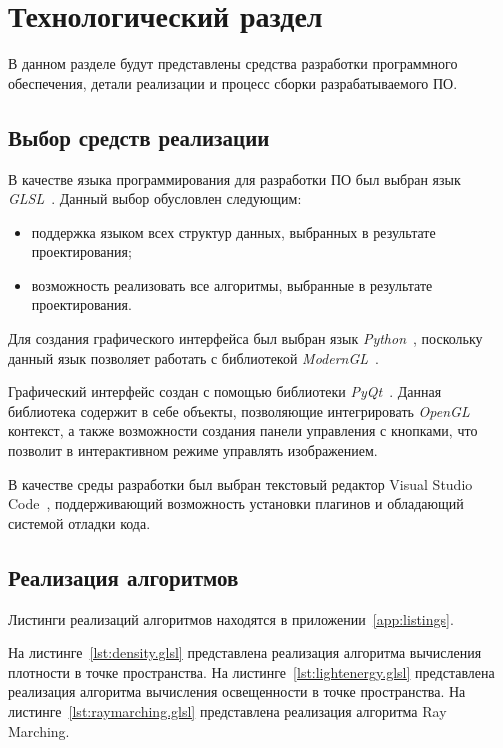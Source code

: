 \chapter{Технологический раздел}

В данном разделе будут представлены средства разработки программного обеспечения, детали реализации и процесс сборки разрабатываемого
ПО.

\section{Выбор средств реализации}

В качестве языка программирования для разработки ПО был выбран язык \textit{GLSL}~\cite{glsl}. Данный выбор обусловлен следующим:
\begin{itemize}
	\item поддержка языком всех структур данных, выбранных в результате проектирования;
	\item возможность реализовать все алгоритмы, выбранные в результате проектирования.
\end{itemize}


Для создания графического интерфейса был выбран язык \textit{Python}~\cite{python}, поскольку данный язык позволяет работать с библиотекой \textit{ModernGL}~\cite{moderngl}.
 
Графический интерфейс создан с помощью библиотеки \textit{PyQt}~\cite{pyqt}. Данная библиотека содержит в себе объекты, позволяющие интегрировать \textit{OpenGL} контекст, а также возможности создания панели управления с кнопками, что позволит в интерактивном режиме управлять изображением.

В качестве среды разработки был выбран текстовый редактор Visual Studio Code~\cite{vsc}, поддерживающий возможность установки плагинов и обладающий системой отладки кода.


\section{Реализация алгоритмов}

Листинги реализаций алгоритмов находятся в приложении~\ref{app:listings}.

На листинге~\ref{lst:density.glsl} представлена реализация алгоритма вычисления плотности в точке пространства. На листинге~\ref{lst:lightenergy.glsl} представлена реализация алгоритма вычисления освещенности в точке пространства. На листинге~\ref{lst:raymarching.glsl} представлена реализация алгоритма Ray Marching.


